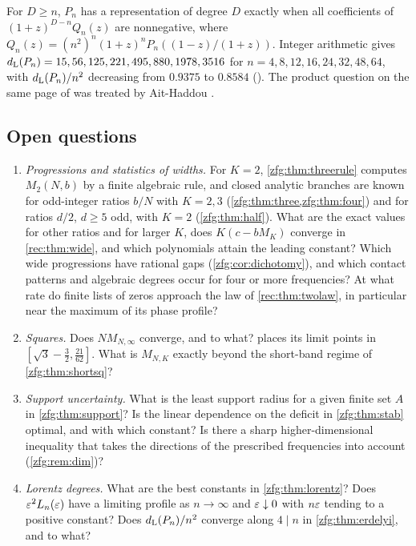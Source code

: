 \begin{remark}\label{zfg:rem:lorentztable}
For $D\ge n$, $P_n$ has a representation of degree $D$ exactly when all coefficients of $(1+z)^{D-n}Q_n(z)$ are nonnegative,
where $Q_n(z)=(n^2)^n(1+z)^nP_n((1-z)/(1+z))$. Integer arithmetic gives $d_{\mathrm L}(P_n)=15,56,125,221,495,880,1978,3516$ for
$n=4,8,12,16,24,32,48,64$, with $d_{\mathrm L}(P_n)/n^2$ decreasing from $0.9375$ to $0.8584$
(). The product question on the
same page of \cite{Erdelyi1991Estimates} was treated by Ait-Haddou \cite{AitHaddou2015Lorentz}.
\end{remark}

\subsection{Open questions}\label{zfg:sec:open}

\begin{enumerate}
\item \emph{Progressions and statistics of widths.} For $K=2$, \cref{zfg:thm:threerule} computes $M_2(N,b)$ by a finite
algebraic rule, and closed analytic branches are known for odd-integer ratios $b/N$ with $K=2,3$
(\cref{zfg:thm:three,zfg:thm:four}) and for ratios $d/2$, $d\ge5$ odd, with $K=2$ (\cref{zfg:thm:half}). What are the exact
values for other ratios and for larger $K$, does $K(c-bM_K)$ converge in \cref{rec:thm:wide}, and which polynomials
attain the leading constant? Which wide progressions have rational gaps (\cref{zfg:cor:dichotomy}), and which contact
patterns and algebraic degrees occur for four or more frequencies? At what rate do finite lists of zeros approach
the law of \cref{rec:thm:twolaw}, in particular near the maximum of its phase profile?
\item \emph{Squares.} Does $NM_{N,\infty}$ converge, and to what?  places its limit points in
$[\sqrt3-\tfrac32,\tfrac{21}{62}]$. What is $M_{N,K}$ exactly beyond the short-band regime of \cref{zfg:thm:shortsq}?
\item \emph{Support uncertainty.} What is the least support radius for a given finite set $A$ in
\cref{zfg:thm:support}? Is the linear dependence on the deficit in \cref{zfg:thm:stab} optimal, and with which constant? Is there a sharp
higher-dimensional inequality that takes the directions of the prescribed frequencies into account
(\cref{zfg:rem:dim})?
\item \emph{Lorentz degrees.} What are the best constants in \cref{zfg:thm:lorentz}? Does $\varepsilon^2L_n(\varepsilon)$ have a limiting
profile as $n\to\infty$ and $\varepsilon\downarrow0$ with $n\varepsilon$ tending to a positive constant? Does $d_{\mathrm L}(P_n)/n^2$ converge along
$4\mid n$ in \cref{zfg:thm:erdelyi}, and to what?
\end{enumerate}
